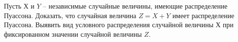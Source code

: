 \begin{comment}
\begin{problem}
\begin{enumerate}
\item[1)] Имеется монетка (несимметричная). Несимметричность монетки заключается в том, что либо орел выпадает в два раза чаще решки; 
либо наоборот (априорно (до проведения опытов) оба варианта считаются равновероятными). Монетку бросили $10$ раз. Орел выпал $7$ раз. 
Определите апостериорную вероятность того, что орел выпадает в два раза чаще решки (апостериорная вероятность считается с учетом 
проведенных опытов (иначе говоря, это просто условная вероятность)). 

\item[2)] Определите апостериорную вероятность того, что орел выпадает не менее чем в два раза чаще решки. Если несимметричность 
монетки заключается в том, что либо орел выпадает не менее чем в два раза чаще решки; либо наоборот (априорно оба варианта считаются 
равновероятными). 
\end{enumerate}
\end{problem}
\end{comment}

\begin{problem}
Пусть $Х$ и $Y$ – независимые случайные величины,  имеющие распределение Пуассона. Доказать, что случайная величина $Z = X + Y$ имеет распределение Пуассона. Выявить вид условного распределения случайной величины $Х$ при фиксированном значении случайной величины $Z$.
\end{problem}
